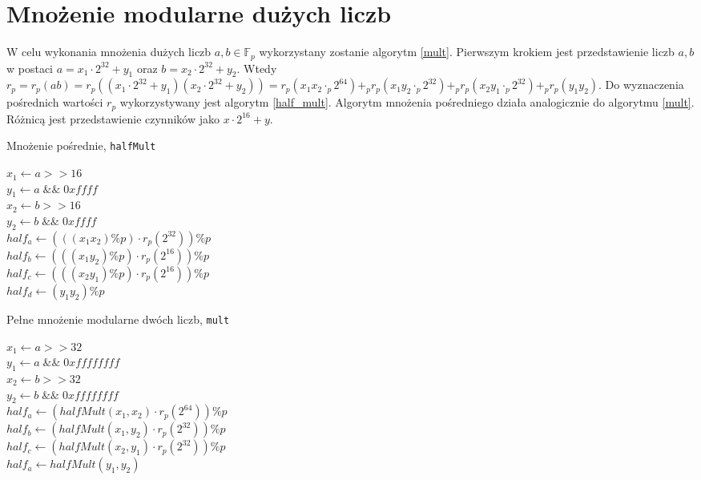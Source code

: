 \documentclass[]{article}
\begin{document}
\section{Mnożenie modularne dużych liczb}
	W celu wykonania mnożenia dużych liczb \(a, b \in \mathbb{F}_p\) wykorzystany zostanie algorytm \ref{mult}.
	Pierwszym krokiem jest przedstawienie liczb \(a, b\) w postaci \(a = x_1 \cdot 2^{32} + y_1\) oraz 
	\(b = x_2 \cdot 2^{32} + y_2\).
	\newline
	Wtedy
	\newline
	\(r_p = r_p(ab) = r_p((x_1 \cdot 2^{32} + y_1)(x_2 \cdot 2^{32} + y_2)) = r_p(x_1x_2 \cdot_p 2^{64}) +_p r_p(x_1y_2 \cdot_p 2^{32}) +_p r_p(x_2y_1 \cdot_p 2^{32}) +_p r_p(y_1y_2)\).
	\newline 
	Do wyznaczenia pośrednich wartości \(r_p\) wykorzystywany jest algorytm \ref{half_mult}. Algorytm mnożenia pośredniego działa analogicznie do algorytmu \ref{mult}. Różnicą jest przedstawienie czynników jako \(x \cdot 2^{16} + y\).
	\newline
	\begin{algorithm}[H]
		\SetAlgoLined
		\caption{Mnożenie pośrednie, \texttt{halfMult}}
		\label{half_mult}
		\(x_1 \gets a >> 16\)\\
		\(y_1 \gets a \; \&\& \; 0xffff \) \\
		\(x_2 \gets b >> 16\)\\
		\(y_2 \gets b \; \&\& \; 0xffff \) \\
		\(half_a \gets (((x_1 x_2) \% p) \cdot r_p(2^{32})) \%p\) \\
		\(half_b \gets (((x_1 y_2) \% p) \cdot r_p(2^{16})) \%p\) \\
		\(half_c \gets (((x_2 y_1) \% p) \cdot r_p(2^{16})) \%p\) \\
		\(half_d \gets (y_1 y_2) \%p\) \\
	\end{algorithm}
	
	\begin{algorithm}[H]
		\SetAlgoLined
		\caption{Pełne mnożenie modularne dwóch liczb, \texttt{mult}}
		\label{mult}
		\(x_1 \gets a >> 32\)\\
		\(y_1 \gets a \; \&\& \; 0xffffffff \) \\
		\(x_2 \gets b >> 32\)\\
		\(y_2 \gets b \; \&\& \; 0xffffffff \) \\
		\(half_a \gets (halfMult(x_1, x_2) \cdot r_p(2^{64})) \% p\) \\
		\(half_b \gets (halfMult(x_1, y_2) \cdot r_p(2^{32})) \% p\) \\
		\(half_c \gets (halfMult(x_2, y_1) \cdot r_p(2^{32})) \% p\) \\
		\(half_a \gets halfMult(y_1, y_2)\) \\
	\end{algorithm}
	
\end{document}

